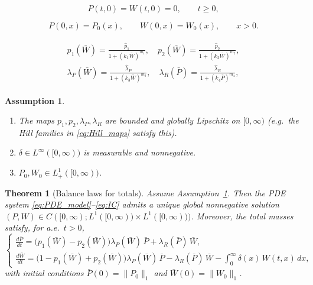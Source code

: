 \documentclass[10pt,a4paper]{amsart}
\newtheorem{assumption}{Assumption}
\newtheorem{theorem}{Theorem}
\begin{document}
\begin{equation}\label{eq:inflow_bc}
P(t,0)=W(t,0)=0,\qquad t\ge 0,
\end{equation}

\begin{equation}\label{eq:IC}
P(0,x)=P_0(x),\qquad W(0,x)=W_0(x),\qquad x>0.
\end{equation}

\begin{align}\label{eq:Hill_maps}
\begin{aligned}
p_1(\bar W)=\frac{\hat p_1}{1+(k_1\bar W)^{m_1}},\quad
p_2(\bar W)=\frac{\hat p_2}{1+(k_2\bar W)^{m_2}},\\[4pt]
\lambda_P(\bar W)=\frac{\hat\lambda_P}{1+(k_3\bar W)^{m_3}},\quad
\lambda_R(\bar P)=\frac{\hat\lambda_R}{1+(k_4\bar P)^{m_4}},
\end{aligned}
\end{align}

\begin{assumption}\label{ass:basic}
\begin{enumerate}[label=(H\arabic*), leftmargin=2.6em]
\item \label{H1}
The maps $p_1,p_2,\lambda_P,\lambda_R$ are bounded and globally Lipschitz on $[0,\infty)$
(e.g.\ the Hill families in \eqref{eq:Hill_maps} satisfy this).
\item \label{H2}
$\delta\in L^\infty([0,\infty))$ is measurable and nonnegative.
\item \label{H3}
$P_0,W_0\in L^1_+([0,\infty))$.
\end{enumerate}
\end{assumption}

\begin{theorem}[Balance laws for totals]
\label{thm:balance-laws}
Assume Assumption~\ref{ass:basic}. Then the PDE system \eqref{eq:PDE_model}--\eqref{eq:IC}
admits a unique global nonnegative solution
$(P,W)\in C([0,\infty);L^1([0,\infty))\times L^1([0,\infty)))$.
Moreover, the total masses satisfy, for a.e.\ $t>0$,
\begin{equation}\label{eq:balance_laws_general}
\begin{cases}
\displaystyle
\frac{d\bar P}{dt}
=\Big(p_1(\bar W)-p_2(\bar W)\Big)\lambda_P(\bar W)\,\bar P
+\lambda_R(\bar P)\,\bar W,\\[8pt]
\displaystyle
\frac{d\bar W}{dt}
=\Big(1-p_1(\bar W)+p_2(\bar W)\Big)\lambda_P(\bar W)\,\bar P
-\lambda_R(\bar P)\,\bar W
-\int_0^\infty \delta(x)\,W(t,x)\,dx,
\end{cases}
\end{equation}
with initial conditions $\bar P(0)=\|P_0\|_{1}$ and $\bar W(0)=\|W_0\|_{1}$.
\end{theorem}
\end{document}
